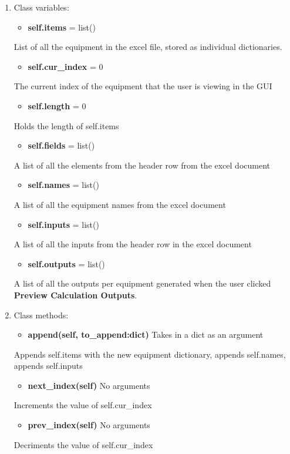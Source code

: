 \documentclass[11pt]{article}
\begin{document}
\begin{enumerate}
\item Class variables:
\label{sec:orga99ecc8}
\begin{itemize}
\item \textbf{self.items} = list()
\end{itemize}
List of all the equipment in the excel file, stored as individual dictionaries.

\begin{itemize}
\item \textbf{self.cur\_index} = 0
\end{itemize}
The current index of the equipment that the user is viewing in the GUI

\begin{itemize}
\item \textbf{self.length} = 0
\end{itemize}
Holds the length of self.items

\begin{itemize}
\item \textbf{self.fields} = list()
\end{itemize}
A list of all the elements from the header row from the excel document

\begin{itemize}
\item \textbf{self.names} = list()
\end{itemize}
A list of all the equipment names from the excel document

\begin{itemize}
\item \textbf{self.inputs} = list()
\end{itemize}
A list of all the inputs from the header row in the excel document

\begin{itemize}
\item \textbf{self.outputs} = list()
\end{itemize}
A list of all the outputs per equipment generated when the user clicked \textbf{Preview Calculation Outputs}. 

\item Class methods:
\label{sec:org2cb4996}

\begin{itemize}
\item \textbf{append(self, to\_append:dict)} Takes in a dict as an argument
\end{itemize}
Appends self.items with the new equipment dictionary, appends self.names, appends self.inputs

\begin{itemize}
\item \textbf{next\_index(self)} No arguments
\end{itemize}
Increments the value of self.cur\_index

\begin{itemize}
\item \textbf{prev\_index(self)} No arguments
\end{itemize}
Decriments the value of self.cur\_index
\end{enumerate}
\end{document}
